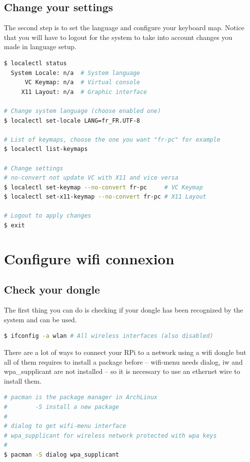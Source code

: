 \subsection{Change your settings}
The second step is to set the language and configure your keyboard map. 
Notice that you will have to logout for the system to take into account 
changes you made in language setup.
\\ 
\begin{lstlisting}[language=bash,caption=Change language settings]
$ localectl status
  System Locale: n/a  # System language
      VC Keymap: n/a  # Virtual console
     X11 Layout: n/a  # Graphic interface
     
# Change system language (choose enabled one)
$ localectl set-locale LANG=fr_FR.UTF-8

# List of keymaps, choose the one you want "fr-pc" for example
$ localectl list-keymaps

# Change settings 
# no-convert not update VC with X11 and vice versa
$ localectl set-keymap --no-convert fr-pc     # VC Keymap
$ localectl set-x11-keymap --no-convert fr-pc # X11 Layout

# Logout to apply changes
$ exit
\end{lstlisting}

\section{Configure wifi connexion}
\subsection{Check your dongle}
The first thing you can do is checking if your dongle has been recognized by 
the system and can be used.

\begin{lstlisting}[language=bash,caption=Check wifi device]
$ ifconfig -a wlan # All wireless interfaces (also disabled)
\end{lstlisting}

There are a lot of ways to connect your RPi to a network using a wifi dongle 
but all of them requires to install a package before -- wifi-menu needs 
dialog, iw and wpa\_supplicant are not installed -- so it is necessary to 
use an ethernet wire to install them.
\newpage
\begin{lstlisting}[language=bash,caption=Install wireless dependencies]
# pacman is the package manager in ArchLinux
#        -S install a new package 
#
# dialog to get wifi-menu interface
# wpa_supplicant for wireless network protected with wpa keys
#
$ pacman -S dialog wpa_supplicant
\end{lstlisting}

